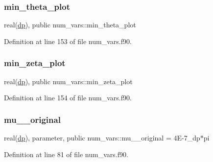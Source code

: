 \subsubsection{\texorpdfstring{min\+\_\+theta\+\_\+plot}{min\_theta\_plot}}
{\footnotesize\ttfamily real(\hyperlink{namespacenum__vars_a03802aa2bd86439d7a9370836fabf3f2}{dp}), public num\+\_\+vars\+::min\+\_\+theta\+\_\+plot}



Definition at line 153 of file num\+\_\+vars.\+f90.

\mbox{\label{namespacenum__vars_a773a55cfd780f1f9db69887fdf48b0a5}} 
\subsubsection{\texorpdfstring{min\+\_\+zeta\+\_\+plot}{min\_zeta\_plot}}
{\footnotesize\ttfamily real(\hyperlink{namespacenum__vars_a03802aa2bd86439d7a9370836fabf3f2}{dp}), public num\+\_\+vars\+::min\+\_\+zeta\+\_\+plot}



Definition at line 154 of file num\+\_\+vars.\+f90.

\mbox{\label{namespacenum__vars_a50e309ca1a5833d2838ed7457b7eb686}} 
\subsubsection{\texorpdfstring{mu\+\_\+\_\+original}{mu\_0\_original}}
{\footnotesize\ttfamily real(\hyperlink{namespacenum__vars_a03802aa2bd86439d7a9370836fabf3f2}{dp}), parameter, public num\+\_\+vars\+::mu\+\_\+\_\+original = 4\+E-\/7\+\_\+dp$\ast$pi}



Definition at line 81 of file num\+\_\+vars.\+f90.

\mbox{\label{namespacenum__vars_a3a1f41c66c3d91fc749bcffd177b0662}} 
